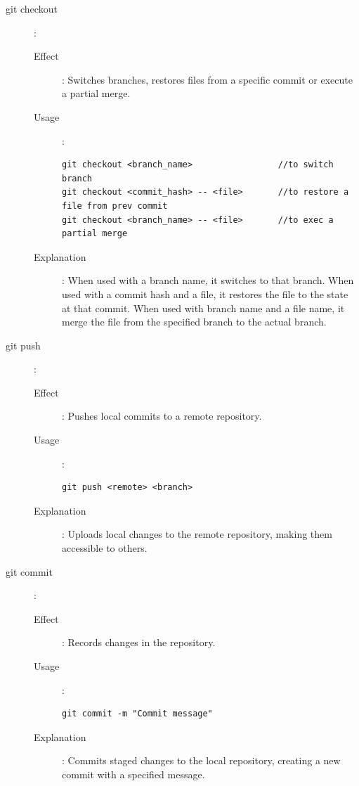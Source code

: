 \begin{description}
\begin{description}
         \end{description}
   \item[git checkout]:
         \begin{description}
            \item[Effect]: Switches branches, restores files from a specific commit or execute a partial merge.
            \item[Usage]:
                  \begin{verbatim}
git checkout <branch_name>                 //to switch branch
git checkout <commit_hash> -- <file>       //to restore a file from prev commit
git checkout <branch_name> -- <file>       //to exec a partial merge
            \end{verbatim}
            \item[Explanation]: When used with a branch name, it switches to that branch. When used with a commit hash and a file, it restores the file to the state at that commit. When used with branch name and a file name, it merge the file from the specified branch to the actual branch.
         \end{description}
   \item[git push]:
         \begin{description}
            \item[Effect]: Pushes local commits to a remote repository.
            \item[Usage]:
                  \begin{verbatim}
git push <remote> <branch>
            \end{verbatim}
            \item[Explanation]: Uploads local changes to the remote repository, making them accessible to others.
         \end{description}
   \item[git commit]:
         \begin{description}
            \item[Effect]: Records changes in the repository.
            \item[Usage]:
                  \begin{verbatim}
git commit -m "Commit message"
            \end{verbatim}
            \item[Explanation]: Commits staged changes to the local repository, creating a new commit with a specified message.

\end{description}
\end{description}
